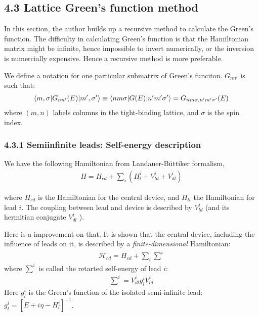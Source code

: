 \documentclass{article}
\numberwithin{equation}{subsection} %
\theoremstyle{definition}
\begin{document}
  \subsection{4.3 Lattice Green’s function method}
  \label{sec:4.3_Lattice_Greens_function_method}
  In this section, the author builds up a recursive method to calculate
  the Green's function. The difficulty in calculating Green's function
  is that the Hamiltonian matrix might be infinite, hence impossible
  to invert numerically, or the inversion is numercially expensive.
  Hence a recursive method is more preferable.

  We define a notation for one particular submatrix of Green's funciton.
  $G_{nn'}$ is such that:
  \begin{align}
      \braket{m,\sigma|G_{nn'}(E)|m',\sigma'} 
          \equiv \braket{nm\sigma |G(E)|n'm'\sigma'}
          = G_{nm\sigma,n'm'\sigma'}(E)
  \end{align}
  where $(m,n)$ labels columns in the tight-binding lattice, 
  and $\sigma$ is the spin index.

    \subsubsection{4.3.1 Semiinfinite leads: Self-energy description}
    \label{sec:4.3.1_Semiinfinite_leads_Self-energy_description}
    We have the following Hamiltonian from Landauer-Büttiker 
    formalism,
    \begin{align}
        H= H_{cd} + \sum_i (H^i_l + V^i_{ld} + V^i_{dl})
        \label{eq:ch4.1.3_H_general}
    \end{align}
    
    where $H_{cd}$ is the Hamiltonian for the central device, and 
    $H_{li}$ the Hamiltonian for lead $i$. The coupling between 
    lead and device is described by $V_{ld}^i$ (and its hermitian
    conjugate $V_{dl}^i$ ). 

    Here is a improvement on that. 
    It is shown that the central device, including the influence of
    leads on it, is described by a \textit{finite-dimensional}
    Hamiltonian:
    \begin{align}
        \mathcal{H}_{cd} = H_{cd} + \sum_i \textstyle\sum^i
    \end{align}
    where $\sum^i$ is called the retarted self-energy of lead $i$:
    \begin{align}
        \textstyle\sum^i = V^i_{dl}g^i_l V^i_{ld}
    \end{align}
    Here $g^i_l$ is the Green's function of the isolated 
    semi-infinite lead: $g^i_l= [E+i\eta -H^i_l]^{-1}$.
\end{document}
